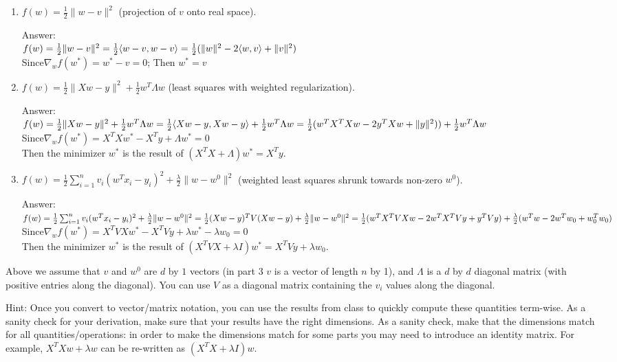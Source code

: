 \documentclass{article}
\def\ans#1{\par\gre{Answer: #1}}
\def\blu#1{{\color{blu}#1}}
\def\gre#1{{\color{gre}#1}}
\def\red#1{{\color{red}#1}}
\def\norm#1{\|#1\|}
\def\enum#1{\begin{enumerate}#1\end{enumerate}}
\begin{document}
\blu{\enum{
\item $f(w) = \frac{1}{2}\norm{w-v}^2$ (projection of $v$ onto real space).
\ans{\\
	$f(w)=\frac{1}{2}\norm{w-v}^2\\
	=\frac{1}{2}\langle w-v,w-v\rangle\\
	=\frac{1}{2}(\|w\|^2-2\langle w,v\rangle+\|v\|^2)$\\
	Since$\nabla_w f(w^*)=w^*-v=0$; Then $w^*=v$}
\item $f(w)= \frac{1}{2}\norm{Xw - y}^2 + \frac{1}{2}w^T\Lambda w$ (least squares with weighted regularization).
\ans{\\
	$f(w)=\frac{1}{2}\norm{Xw - y}^2 + \frac{1}{2}w^T\Lambda w\\
	=\frac{1}{2}\langle Xw-y,Xw-y\rangle+ \frac{1}{2}w^T\Lambda w\\
	=\frac{1}{2}(w^TX^TXw-2y^TXw+\|y\|^2))+ \frac{1}{2}w^T\Lambda w$\\
Since$\nabla_w f(w^*)=X^TXw^*-X^Ty+\Lambda w^*=0$\\ 
Then the minimizer $w^*$ is the result of $ (X^TX+\Lambda) w^*=X^Ty$.}
\item $f(w) = \frac{1}{2}\sum_{i=1}^n v_i (w^Tx_i - y_i)^2 + \frac{\lambda}{2}\norm{w-w^0}^2$ (weighted least squares shrunk towards non-zero $w^0$).
\ans{\\
	$f(w) = \frac{1}{2}\sum_{i=1}^n v_i (w^Tx_i - y_i)^2 + \frac{\lambda}{2}\norm{w-w^0}^2\\
	=\frac{1}{2} (Xw-y)^TV (Xw-y)+\frac{\lambda}{2}\norm{w-w^0}^2\\
	=\frac{1}{2}(w^TX^TVXw-2w^TX^TVy+y^TVy)+\frac{\lambda}{2}(w^Tw-2w^Tw_0+w_0^Tw_0)$\\
Since$\nabla_w f(w^*)=X^TVXw^*-X^TVy+\lambda w^*-\lambda w_0=0$\\
Then the minimizer $w^*$ is the result of  $(X^TVX+\lambda I)w^*=X^TVy+\lambda w_0$. }
}}
Above we assume that $v$ and $w^0$ are $d$ by $1$ vectors (in part 3 $v$ is a vector of length $n$ by 1), and $\Lambda$ is a $d$ by $d$ diagonal matrix (with positive entries along the diagonal). You can use $V$ as a diagonal matrix containing the $v_i$ values along the diagonal.

Hint: Once you convert to vector/matrix notation, you can use the results from class to quickly compute these quantities term-wise.
As a sanity check for your derivation, make sure that your results have the right dimensions. \red{As a sanity check, make that the dimensions match for all quantities/operations: in order to make the dimensions match for some parts you may need to introduce an identity matrix. For example, $X^TXw + \lambda w$ can be re-written as $(X^TX + \lambda I)w$.}
\end{document}
